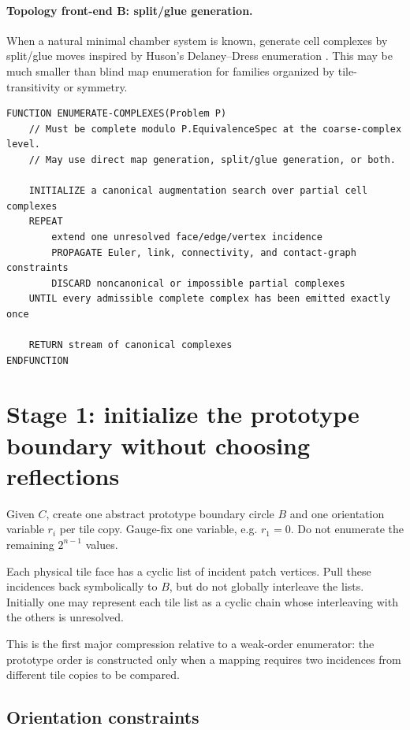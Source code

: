 \documentclass[11pt]{article}
\begin{document}
\paragraph{Topology front-end B: split/glue generation.}
When a natural minimal chamber system is known, generate cell complexes by split/glue moves inspired by Huson's Delaney--Dress enumeration \cite{Huson1993}.  This may be much smaller than blind map enumeration for families organized by tile-transitivity or symmetry.

\begin{lstlisting}[caption={Coarse complex enumeration contract.}]
FUNCTION ENUMERATE-COMPLEXES(Problem P)
    // Must be complete modulo P.EquivalenceSpec at the coarse-complex level.
    // May use direct map generation, split/glue generation, or both.

    INITIALIZE a canonical augmentation search over partial cell complexes
    REPEAT
        extend one unresolved face/edge/vertex incidence
        PROPAGATE Euler, link, connectivity, and contact-graph constraints
        DISCARD noncanonical or impossible partial complexes
    UNTIL every admissible complete complex has been emitted exactly once

    RETURN stream of canonical complexes
ENDFUNCTION
\end{lstlisting}

\section{Stage 1: initialize the prototype boundary without choosing reflections}

Given $C$, create one abstract prototype boundary circle $B$ and one orientation variable $r_i$ per tile copy.  Gauge-fix one variable, e.g. $r_1=0$.  Do not enumerate the remaining $2^{n-1}$ values.

Each physical tile face has a cyclic list of incident patch vertices.  Pull these incidences back symbolically to $B$, but do not globally interleave the lists.  Initially one may represent each tile list as a cyclic chain whose interleaving with the others is unresolved.

This is the first major compression relative to a weak-order enumerator: the prototype order is constructed only when a mapping requires two incidences from different tile copies to be compared.

\subsection{Orientation constraints}
\end{document}
